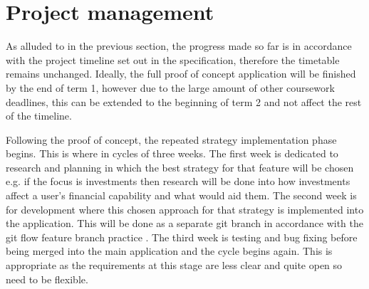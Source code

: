 \section{Project management}

As alluded to in the previous section, the progress made so far is in accordance with the project timeline set out in the specification, therefore the timetable remains unchanged. Ideally, the full proof of concept application will be finished by the end of term 1, however due to the large amount of other coursework deadlines, this can be extended to the beginning of term 2 and not affect the rest of the timeline.

Following the proof of concept, the repeated strategy implementation phase begins. This is where in cycles of three weeks. The first week is dedicated to research and planning in which the best strategy for that feature will be chosen e.g. if the focus is investments then research will be done into how investments affect a user's financial capability and what would aid them. The second week is for development where this chosen approach for that strategy is implemented into the application. This will be done as a separate git branch in accordance with the git flow feature branch practice \cite{GitFlow}. The third week is testing and bug fixing before being merged into the main application and the cycle begins again. This is appropriate as the requirements at this stage are less clear and quite open so need to be flexible.